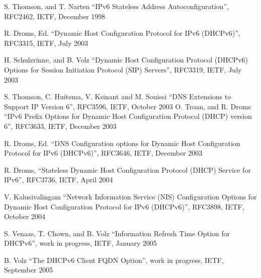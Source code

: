 \newpage
\begin{thebibliography}{1}

 S. Thomson, and T. Narten ``IPv6 Stateless Address
  Autoconfiguration'', RFC2462, IETF, December 1998

 R. Droms, Ed. ``Dynamic Host Configuration Protocol
  for IPv6 (DHCPv6)'', RFC3315, IETF, July 2003

 H. Schulzrinne, and B. Volz ``Dynamic Host
  Configuration Protocol (DHCPv6) Options for Session Initiation
  Protocol (SIP) Servers'', RFC3319, IETF, July 2003

 S. Thomson, C. Huitema, V. Ksinant and M. Souissi
  ``DNS Extensions to Support IP Version 6'', RFC3596, IETF, October
  2003
 O. Troan, and R. Droms ``IPv6 Prefix Options for
  Dynamic Host Configuration Protocol (DHCP) version 6'', RFC3633,
  IETF, December 2003

 R. Droms, Ed. ``DNS Configuration options for
  Dynamic Host Configuration Protocol for IPv6 (DHCPv6)'', RFC3646,
  IETF, December 2003

 R. Droms, ``Stateless Dynamic Host Configuration
  Protocol (DHCP) Service for IPv6'', RFC3736, IETF, April 2004

 V. Kalusivalingam ``Network Information Service
  (NIS) Configuration Options for Dynamic Host Configuration Protocol
  for IPv6 (DHCPv6)'', RFC3898, IETF, October 2004

 S. Venaas, T. Chown, and B. Volz
  ``Information Refresh Time Option for DHCPv6'', work in
  progress, IETF, January 2005

 B. Volz
  ``The DHCPv6 Client FQDN Option'', work in
  progress, IETF, September 2005

\end{thebibliography}
